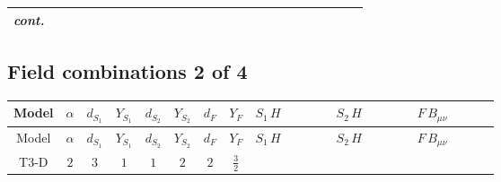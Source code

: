 \documentclass[8pt]{article}
\begin{document}
\begin{landscape}
\begin{longtable}{@{}cccccccc >{\raggedright\arraybackslash}p{0.21\linewidth} >{\raggedright\arraybackslash}p{0.21\linewidth} >{\raggedright\arraybackslash}p{0.21\linewidth}@{}}
\textit{cont.} &  &  &  &  &  &  &  & \scriptsize\adjustbox{max width=\linewidth}{$\begin{gathered} -\frac{2 \hbar  \log \left(\frac{\bar{\mu}^{2}}{m_2^2}\right) \overline{\lambda_5} H_{a_1} H_{a_2} m_2^2 \lambda_5 H_{a_1}{}^{\dagger } H_{a_2}{}^{\dagger }}{\sqrt{3} \left(m_1^2-m_2^2\right)} \\ +\text{CH21} \hbar  H_{a_2} H_{a_1}{}^{\dagger } \mathcal{I}_{H2,a_1,a_2}{}^1\end{gathered}$} &  &  \\
\midrule
\bottomrule
\end{longtable}
\clearpage
\subsection*{Field combinations 2 of 4}
\begin{longtable}{@{}cccccccc >{\raggedright\arraybackslash}p{0.21\linewidth} >{\raggedright\arraybackslash}p{0.21\linewidth} >{\raggedright\arraybackslash}p{0.21\linewidth}@{}}
\toprule
Model & $\alpha$ & $d_{S_1}$ & $Y_{S_1}$ & $d_{S_2}$ & $Y_{S_2}$ & $d_F$ & $Y_F$ & $S_1\,H$ & $S_2\,H$ & $F\,B_{\mu\nu}$ \\
\midrule
\endfirsthead
\toprule
Model & $\alpha$ & $d_{S_1}$ & $Y_{S_1}$ & $d_{S_2}$ & $Y_{S_2}$ & $d_F$ & $Y_F$ & $S_1\,H$ & $S_2\,H$ & $F\,B_{\mu\nu}$ \\
\midrule
\endhead
T3-D & $2$ & $3$ & $1$ & $1$ & $2$ & $2$ & $\frac{3}{2}$ & \scriptsize\adjustbox{max width=\linewidth}{$\begin{gathered} +\frac{3 \hbar  H_{a_1} H_{a_2} H_{a_1}{}^{\dagger } H_{a_2}{}^{\dagger } \left(\lambda_{HS_1}^{(1)}^{(2)}\right){}^2}{2 \epsilon } \\ +\frac{3}{2} \hbar  \log \left(\frac{\bar{\mu}^{2}}{m_1^2}\right) H_{a_1} H_{a_2} H_{a_1}{}^{\dagger } H_{a_2}{}^{\dagger } \left(\lambda_{HS_1}^{(1)}^{(2)}\right){}^2\end{gathered}$} & \scriptsize\adjustbox{max width=\linewidth}{$\begin{gathered} +\frac{\hbar  H_{a_3} H_{a_4} H_{a_1}{}^{\dagger } H_{a_2}{}^{\dagger } \mathcal{I}_{H2,a_1,a_3}{}^1 \mathcal{I}_{H2,a_2,a_4}{}^1 \left(\lambda_{HS_2}^{(1)}^{(1)}\right){}^2}{2 \epsilon } \\ +\frac{1}{2} \hbar  \log \left(\frac{\bar{\mu}^{2}}{m_2^2}\right) H_{a_3} H_{a_4} H_{a_1}{}^{\dagger } H_{a_2}{}^{\dagger } \mathcal{I}_{H2,a_1,a_3}{}^1 \mathcal{I}_{H2,a_2,a_4}{}^1 \left(\lambda_{HS_2}^{(1)}^{(1)}\right){}^2\end{gathered}$} & \scriptsize\adjustbox{max width=\linewidth}{$\begin{gathered} -\frac{9}{2} \hbar  \log \left(\frac{\bar{\mu}^{2}}{M_F^2}\right) B_{\mu _1\mu _2}^2\end{gathered}$} \\
\midrule
\bottomrule
\end{longtable}
\clearpage

\end{landscape}
\end{document}
